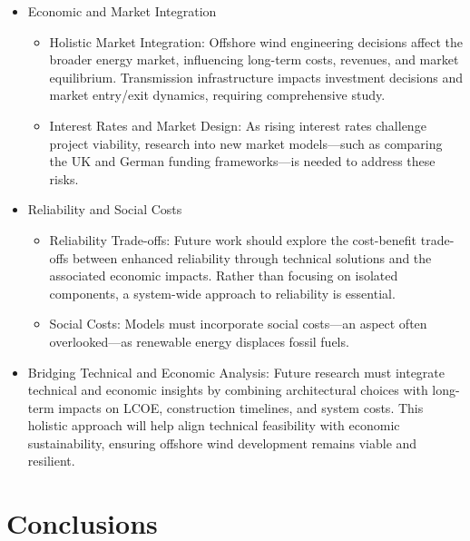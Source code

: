 \documentclass{ieeeaccess}
\begin{document}
\begin{itemize}
\item {{Economic and Market Integration}}
\begin{itemize}
\item {Holistic Market Integration:} Offshore wind engineering decisions affect the broader energy market, influencing {long-term costs, revenues, and market equilibrium}. Transmission infrastructure impacts {investment decisions} and {market entry/exit dynamics}, requiring comprehensive study.

\item {Interest Rates and Market Design:} As rising interest rates challenge project viability, research into new market models—such as comparing the {UK and German funding frameworks}—is needed to address these risks.
\end{itemize}

\item {{Reliability and Social Costs}}

\begin{itemize}
\item {Reliability Trade-offs:} Future work should explore the cost-benefit trade-offs between enhanced reliability through technical solutions and the associated economic impacts. Rather than focusing on isolated components, a system-wide approach to reliability is essential.

\item {Social Costs:} Models must incorporate social costs—an aspect often overlooked—as renewable energy displaces fossil fuels.
\end{itemize}

\item {{Bridging Technical and Economic Analysis:}}
Future research must integrate {technical and economic insights} by combining architectural choices with long-term impacts on {LCOE, construction timelines}, and system costs. This holistic approach will help align technical feasibility with economic sustainability, ensuring offshore wind development remains viable and resilient.
\end{itemize}


\section{\textbf{Conclusions}}
\end{document}

